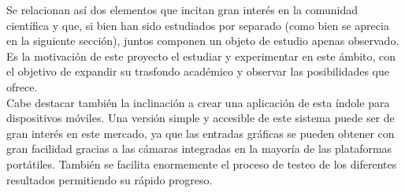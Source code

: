 Se relacionan así dos elementos que incitan gran interés en la comunidad científica y que, si bien han sido estudiados por separado (como bien se aprecia en la siguiente sección), juntos componen un objeto de estudio apenas observado. Es la motivación de este proyecto el estudiar y experimentar en este ámbito, con el objetivo de expandir su trasfondo académico y observar las posibilidades que ofrece.\\

Cabe destacar también la inclinación a crear una aplicación de esta índole para dispositivos móviles. Una versión simple y accesible de este sistema puede ser de gran interés en este mercado, ya que las entradas gráficas se pueden obtener con gran facilidad gracias a las cámaras integradas en la mayoría de las plataformas portátiles. También se facilita enormemente el proceso de testeo de los diferentes resultados permitiendo su rápido progreso.